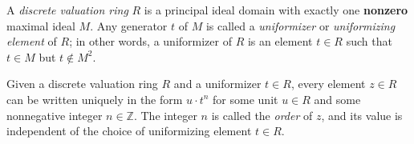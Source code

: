\documentclass{article}
\begin{document}
A \emph{discrete valuation ring} $R$ is a principal ideal domain with exactly one \textbf{nonzero} maximal ideal $M$. Any generator $t$ of $M$ is called a \emph{uniformizer} or \emph{uniformizing element} of $R$; in other words, a uniformizer of $R$ is an element $t \in R$ such that $t \in M$ but $t \notin M^2$.

Given a discrete valuation ring $R$ and a uniformizer $t \in R$, every element $z \in R$ can be written uniquely in the form $u \cdot t^n$ for some unit $u \in R$ and some nonnegative integer $n \in \mathbb{Z}$. The integer $n$ is called the \emph{order} of $z$, and its value is independent of the choice of uniformizing element $t \in R$.
\end{document}
